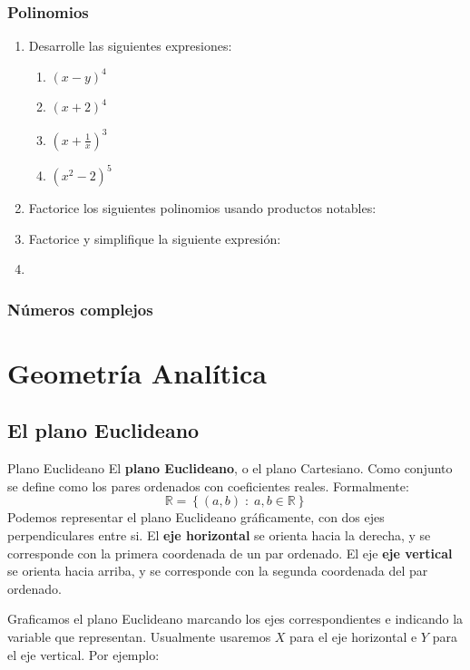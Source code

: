 \documentclass[11pt, twoside]{book}
\newcommand{\set}[1]{\left\lbrace #1 \right\rbrace}
\begin{document}
\subsection*{Polinomios}
\begin{enumerate}
    \item Desarrolle las siguientes expresiones:
        \begin{enumerate}
            \item \((x-y)^4\)
            \item \((x+2)^4\)
            \item \(\left(x+\frac{1}{x}\right)^3\)
            \item \((x^2-2)^5\)
        \end{enumerate}
    \item Factorice los siguientes polinomios usando productos notables:
    \item Factorice y simplifique la siguiente expresión:
    \item 
\end{enumerate}
\subsection*{Números complejos}


\chapter{Geometría Analítica}
\section{El plano Euclideano}
\begin{definition}{Plano Euclideano}
El \textbf{plano Euclideano}, o el plano Cartesiano. Como conjunto se define como los pares ordenados con coeficientes reales. Formalmente:
    \[\mathbb{R}=\set{(a,b)\;:\;a,b\in\mathbb{R}}\]
Podemos representar el plano Euclideano gráficamente, con dos ejes perpendiculares entre si. El \textbf{eje horizontal} se orienta hacia la derecha, y se corresponde con la primera coordenada de un par ordenado.
El eje \textbf{eje vertical} se orienta hacia arriba, y se corresponde con la segunda coordenada del par ordenado.

Graficamos el plano Euclideano marcando los ejes correspondientes e indicando la variable que representan. Usualmente usaremos \(X\) para el eje horizontal e \(Y\) para el eje vertical.
Por ejemplo:
\end{definition}
\end{document}

